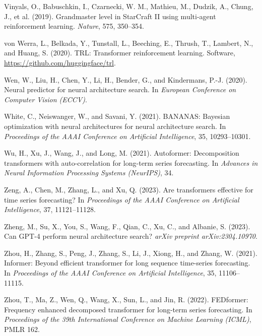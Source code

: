 \documentclass[11pt,letterpaper]{article}
\begin{document}
\begin{list}{}{\setlength{\leftmargin}{1.5em}\setlength{\itemindent}{-1.5em}\setlength{\itemsep}{2pt}\setlength{\parsep}{0pt}}
\item Vinyals, O., Babuschkin, I., Czarnecki, W. M., Mathieu, M., Dudzik, A., Chung, J., et al. (2019). Grandmaster level in StarCraft II using multi-agent reinforcement learning. \textit{Nature}, 575, 350--354.
\item von Werra, L., Belkada, Y., Tunstall, L., Beeching, E., Thrush, T., Lambert, N., and Huang, S. (2020). TRL: Transformer reinforcement learning. Software, \url{https://github.com/huggingface/trl}.
\item Wen, W., Liu, H., Chen, Y., Li, H., Bender, G., and Kindermans, P.-J. (2020). Neural predictor for neural architecture search. In \textit{European Conference on Computer Vision (ECCV)}.
\item White, C., Neiswanger, W., and Savani, Y. (2021). BANANAS: Bayesian optimization with neural architectures for neural architecture search. In \textit{Proceedings of the AAAI Conference on Artificial Intelligence}, 35, 10293--10301.
\item Wu, H., Xu, J., Wang, J., and Long, M. (2021). Autoformer: Decomposition transformers with auto-correlation for long-term series forecasting. In \textit{Advances in Neural Information Processing Systems (NeurIPS)}, 34.
\item Zeng, A., Chen, M., Zhang, L., and Xu, Q. (2023). Are transformers effective for time series forecasting? In \textit{Proceedings of the AAAI Conference on Artificial Intelligence}, 37, 11121--11128.
\item Zheng, M., Su, X., You, S., Wang, F., Qian, C., Xu, C., and Albanie, S. (2023). Can GPT-4 perform neural architecture search? \textit{arXiv preprint arXiv:2304.10970}.
\item Zhou, H., Zhang, S., Peng, J., Zhang, S., Li, J., Xiong, H., and Zhang, W. (2021). Informer: Beyond efficient transformer for long sequence time-series forecasting. In \textit{Proceedings of the AAAI Conference on Artificial Intelligence}, 35, 11106--11115.
\item Zhou, T., Ma, Z., Wen, Q., Wang, X., Sun, L., and Jin, R. (2022). FEDformer: Frequency enhanced decomposed transformer for long-term series forecasting. In \textit{Proceedings of the 39th International Conference on Machine Learning (ICML)}, PMLR 162.
\end{list}
\end{document}
